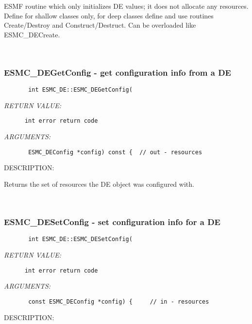         ESMF routine which only initializes DE values; it does not
        allocate any resources.  Define for shallow classes only,
        for deep classes define and use routines Create/Destroy and
        Construct/Destruct.  Can be overloaded like ESMC\_DECreate.
   
 
\mbox{}\hrulefill\ 
 
\subsubsection{ESMC\_DEGetConfig - get configuration info from a DE}


  
\begin{verbatim}       int ESMC_DE::ESMC_DEGetConfig(\end{verbatim}{\em RETURN VALUE:}
\begin{verbatim}      int error return code\end{verbatim}{\em ARGUMENTS:}
\begin{verbatim}       ESMC_DEConfig *config) const {  // out - resources\end{verbatim}
{\sf DESCRIPTION:\\ }


      Returns the set of resources the DE object was configured with.
   
 
\mbox{}\hrulefill\ 
 
\subsubsection{ESMC\_DESetConfig - set configuration info for a DE}


  
\begin{verbatim}       int ESMC_DE::ESMC_DESetConfig(\end{verbatim}{\em RETURN VALUE:}
\begin{verbatim}      int error return code\end{verbatim}{\em ARGUMENTS:}
\begin{verbatim}       const ESMC_DEConfig *config) {     // in - resources\end{verbatim}
{\sf DESCRIPTION:\\ }


